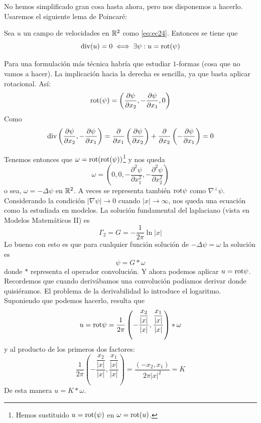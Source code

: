 No hemos simplificado gran cosa hasta ahora, pero nos disponemos a hacerlo. \\

Usaremos el siguiente lema de Poincaré:

\begin{lema}[de Poincaré]
    Sea $u$ un campo de velocidades en $\mathbb{R}^2$ como \eqref{eq:ec24}. Entonces se tiene que 
    $$\text{div}(u) = 0 \iff \exists \psi : u = \text{rot}(\psi)$$
\end{lema}

\begin{observacion}
    Para una formulación más técnica habría que estudiar $1$-formas (cosa que no vamos a hacer). La implicación hacia la derecha es sencilla,
    ya que basta aplicar rotacional. Así:
    $$\text{rot}(\psi) = \left(
        \dfrac{\partial \psi}{\partial x_2}, - \dfrac{\partial \psi}{\partial x_1}, 0
    \right)$$
    Como $$\text{div}\left( \dfrac{\partial \psi}{\partial x_2}, - \dfrac{\partial \psi}{\partial x_1} \right) = 
    \dfrac{\partial}{\partial x_1} \left( \dfrac{\partial \psi}{\partial x_2} \right) + 
    \dfrac{\partial}{\partial x_2} \left( - \dfrac{\partial \psi}{\partial x_1} \right) = 0$$
\end{observacion}

Tenemos entonces que $\omega = \text{rot}(\text{rot}(\psi))$\footnote{Hemos sustituido $u = \text{rot}(\psi)$ en $\omega = \text{rot}(u)$.}
y nos queda 
$$\omega = \left(0, 0, - \dfrac{\partial^2 \psi}{\partial x_1^2}, - \dfrac{\partial^2 \psi}{\partial x_2^2} \right)$$
o sea, $\omega = - \Delta \psi$ en $\mathbb{R}^2$.
A veces se representa también $\text{rot} \psi$ como $\nabla^\perp \psi$.
Considerando la condición $|\nabla \psi| \to 0$ cuando $|x| \to \infty$, nos queda una ecuación como la estudiada en modelos.
La solución fundamental del laplaciano (vista en Modelos Matemáticos II) es
$$\Gamma_2 = G = - \dfrac{1}{2 \pi} \ln |x|$$
Lo bueno con esto es que para cualquier función solución de $-\Delta \psi = \omega$ la solución es 
$$\psi = G \ast \omega$$
donde $\ast$ representa el operador convolución. Y ahora podemos aplicar $u = \text{rot} \psi$. Recordemos que cuando 
derivábamos una convolución podíamos derivar donde quisiéramos. El problema de la derivabilidad lo introduce el logaritmo. Suponiendo 
que podemos hacerlo, resulta que 
$$u = \text{rot} \psi = \dfrac{1}{2 \pi} \left( - \dfrac{\dfrac{x_2}{|x|}}{|x|}, \dfrac{\dfrac{x_1}{|x|}}{|x|} \right) \ast \omega$$
y al producto de los primeros dos factores:
\begin{equation}\label{eq:ec26}
    \dfrac{1}{2 \pi} \left( - \dfrac{\dfrac{x_2}{|x|}}{|x|}, \dfrac{\dfrac{x_1}{|x|}}{|x|} \right) = \dfrac{(-x_2, x_1)}{2 \pi |x|^2} = K
\end{equation}
De esta manera $u = K \ast \omega$. \\

